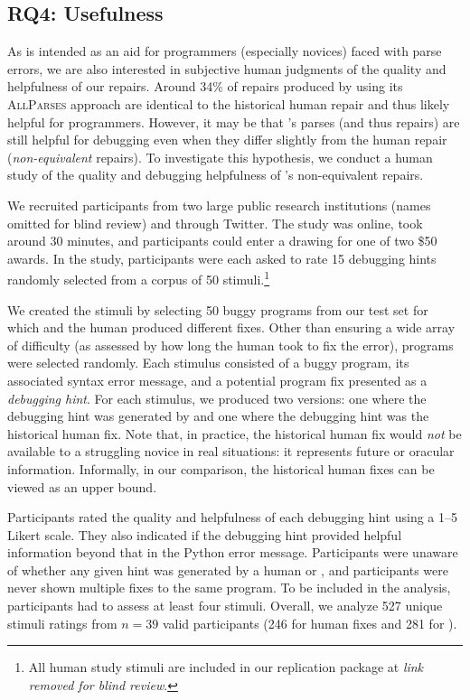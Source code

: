 \subsection{RQ4: Usefulness}
\label{sec:eval:useful}


As \toolname is intended as an aid for programmers (especially novices) faced
with parse errors, we are also interested in subjective human judgments of the
quality and helpfulness of our repairs. Around 34\% of repairs produced by
\toolname using its \textsc{AllParses} approach are identical to the historical
human repair and thus likely helpful for programmers. However, it may be that
\toolname's parses (and thus repairs) are still helpful for debugging even when
they differ slightly from the human repair (\ie \textit{non-equivalent}
repairs). To investigate this hypothesis, we conduct a human study of the
quality and debugging helpfulness of \toolname's non-equivalent repairs.

 We recruited participants from two large public
research institutions (names omitted for blind review) and through Twitter.
The study was online, took around 30 minutes, and participants could enter a
drawing for one of two \$50 awards. In the study, participants
were each asked to rate 15 debugging hints randomly selected from a corpus of 50
stimuli.\footnote{All human study stimuli are included in our replication
package at \emph{link removed for blind review}.}

We created the stimuli by selecting 50 buggy programs from our test set for
which \toolname and the human produced different fixes. Other than ensuring a
wide array of difficulty (as assessed by how long the human took to fix the
error), programs were selected randomly. Each stimulus consisted of a buggy
program, its associated syntax error message, and a potential program fix
presented as a \emph{debugging hint}. For each stimulus, we produced two
versions: one where the debugging hint was generated by \toolname and one where
the debugging hint was the historical human fix. Note that, in practice, the
historical human fix would \emph{not} be available to a struggling novice
in real situations: it represents future or oracular information. Informally, in
our comparison, the historical human fixes can be viewed as an upper bound.

Participants rated the quality and
helpfulness of each debugging hint using a 1--5 Likert scale. They also indicated
if the debugging hint provided helpful information beyond that in the Python
error message.
Participants were unaware of whether any given hint was generated by a human or
\toolname, and participants were never shown multiple
fixes to the same program. To be included in the analysis, participants
had to assess at least four stimuli. Overall, we analyze 527 unique stimuli
ratings from $n=39$ valid participants (246 for human fixes and 281 for
\toolname).

